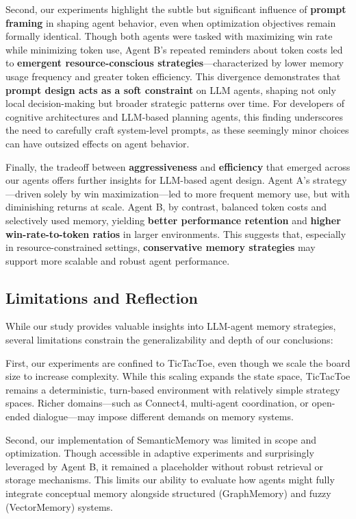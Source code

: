 \documentclass[10pt]{article}
\begin{document}
Second, our experiments highlight the subtle but significant influence of \textbf{prompt framing} in shaping agent behavior, even when optimization objectives remain formally identical. Though both agents were tasked with maximizing win rate while minimizing token use, Agent B's repeated reminders about token costs led to \textbf{emergent resource-conscious strategies}—characterized by lower memory usage frequency and greater token efficiency. This divergence demonstrates that \textbf{prompt design acts as a soft constraint} on LLM agents, shaping not only local decision-making but broader strategic patterns over time. For developers of cognitive architectures and LLM-based planning agents, this finding underscores the need to carefully craft system-level prompts, as these seemingly minor choices can have outsized effects on agent behavior.

Finally, the tradeoff between \textbf{aggressiveness} and \textbf{efficiency} that emerged across our agents offers further insights for LLM-based agent design. Agent A's strategy—driven solely by win maximization—led to more frequent memory use, but with diminishing returns at scale. Agent B, by contrast, balanced token costs and selectively used memory, yielding \textbf{better performance retention} and \textbf{higher win-rate-to-token ratios} in larger environments. This suggests that, especially in resource-constrained settings, \textbf{conservative memory strategies} may support more scalable and robust agent performance.

\subsection{Limitations and Reflection}

While our study provides valuable insights into LLM-agent memory strategies, several limitations constrain the generalizability and depth of our conclusions:

First, our experiments are confined to TicTacToe, even though we scale the board size to increase complexity. While this scaling expands the state space, TicTacToe remains a deterministic, turn-based environment with relatively simple strategy spaces. Richer domains—such as Connect4, multi-agent coordination, or open-ended dialogue—may impose different demands on memory systems.

Second, our implementation of SemanticMemory was limited in scope and optimization. Though accessible in adaptive experiments and surprisingly leveraged by Agent B, it remained a placeholder without robust retrieval or storage mechanisms. This limits our ability to evaluate how agents might fully integrate conceptual memory alongside structured (GraphMemory) and fuzzy (VectorMemory) systems.
\end{document}
